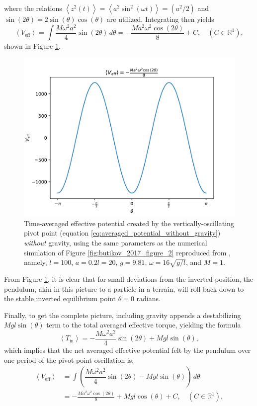 \documentclass[12pt, letterpaper]{article}
\begin{document}
where the relations $\left<z^2(t)\right> = \left< a^2 \sin^2(\omega t) \right> = \left(a^2/2\right)$ and $\sin(2\theta) = 2\sin(\theta)\cos(\theta)$ are utilized. Integrating then yields
\begin{equation}
  \left<V_{\mathrm{eff}}\right> = \int \dfrac{M\omega^2 a^2}{4}\sin(2\theta) \, d \theta = -\frac{Ma^{2}\omega^{2}\cos\left(2\theta\right)}{8} + C, \quad \left(C \in \mathbb{R}^1\right) \label{eq:averaged_potential_without_gravity}, 
\end{equation}
shown in Figure \ref{fig:ButikovKapitzaVeff_without_Gravity}.
\begin{figure}
    \centering
    \includegraphics[width=0.5\linewidth]{Veff_without_Gravity.pdf}
    \caption{Time-averaged effective potential created by the vertically-oscillating pivot point (equation \ref{eq:averaged_potential_without_gravity}) \emph{without} gravity, using the same parameters as the numerical simulation of Figure \ref{fig:butikov_2017_figure_2} reproduced from \cite{Butikov2017KapitzaS}, namely, $l = 100$, $a = 0.2l = 20$, $g = 9.81$, $\omega = 16\sqrt{g/l}$, and $M = 1$.}
    \label{fig:ButikovKapitzaVeff_without_Gravity}
\end{figure}
From Figure \ref{fig:ButikovKapitzaVeff_without_Gravity}, it is clear that for small deviations from the inverted position, the pendulum, akin in this picture to a particle in a terrain, will roll back down to the stable inverted equilibrium point $\theta = 0$ radians.
\par Finally, to get the complete picture, including gravity appends a destabilizing $Mgl\sin(\theta)$ term to the total averaged effective torque, yielding the formula
\begin{equation}
    \left<T_{\text{in}}\right> = -\dfrac{M\omega^2 a^2}{4}\sin(2\theta) + Mgl\sin(\theta) \label{eq:total_averaged_eff_torque},
\end{equation}
which implies that the net averaged effective potential felt by the pendulum over one period of the pivot-point oscillation is:
\begin{align}
\left<V_{\mathrm{eff}}\right> &= \int \left(\dfrac{M\omega^2
a^2}{4}\sin(2\theta) - Mgl\sin(\theta)\right) \, d \theta \nonumber \\ &=
-\frac{Ma^{2}\omega^{2}\cos\left(2\theta\right)}{8} + Mgl\cos(\theta) + C, \quad \left(C
\in \mathbb{R}^1\right) \label{eq:averaged_potential_with_gravity},
\end{align}
\end{document}
